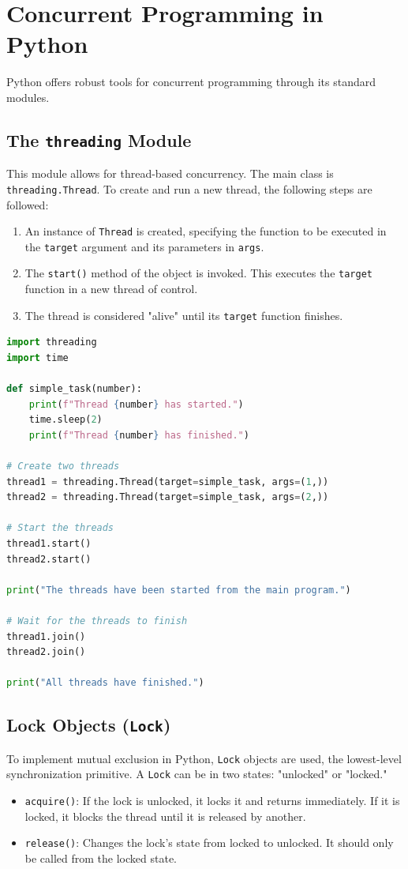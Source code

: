 \section{Concurrent Programming in Python}
Python offers robust tools for concurrent programming through its standard modules.

\subsection{The \texttt{threading} Module}
This module allows for thread-based concurrency. The main class is \texttt{threading.Thread}. To create and run a new thread, the following steps are followed:
\begin{enumerate}
    \item An instance of \texttt{Thread} is created, specifying the function to be executed in the \texttt{target} argument and its parameters in \texttt{args}.
    \item The \texttt{start()} method of the object is invoked. This executes the \texttt{target} function in a new thread of control.
    \item The thread is considered "alive" until its \texttt{target} function finishes.
\end{enumerate}

\begin{lstlisting}[language=Python, caption=Example of thread creation in Python]
import threading
import time

def simple_task(number):
    print(f"Thread {number} has started.")
    time.sleep(2)
    print(f"Thread {number} has finished.")

# Create two threads
thread1 = threading.Thread(target=simple_task, args=(1,))
thread2 = threading.Thread(target=simple_task, args=(2,))

# Start the threads
thread1.start()
thread2.start()

print("The threads have been started from the main program.")

# Wait for the threads to finish
thread1.join()
thread2.join()

print("All threads have finished.")
\end{lstlisting}

\subsection{Lock Objects (\texttt{Lock})}
To implement mutual exclusion in Python, \texttt{Lock} objects are used, the lowest-level synchronization primitive. A \texttt{Lock} can be in two states: "unlocked" or "locked."
\begin{itemize}
    \item \texttt{acquire()}: If the lock is unlocked, it locks it and returns immediately. If it is locked, it blocks the thread until it is released by another.
    \item \texttt{release()}: Changes the lock's state from locked to unlocked. It should only be called from the locked state.
\end{itemize}


